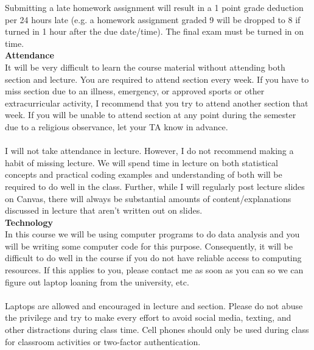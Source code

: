 \documentclass[12pt]{article}
\begin{document}
\noindent Submitting a late homework assignment will result in a 1 point grade deduction per 24 hours late (e.g. a homework assignment graded 9 will be dropped to 8 if turned in 1 hour after the due date/time).  The final exam must be turned in on time.\\

\noindent \Large \textbf{Attendance}\normalsize\\

\noindent It will be very difficult to learn the course material without attending both section and lecture.  You are required to attend section every week.  If you have to miss section due to an illness, emergency, or approved sports or other extracurricular activity, I recommend that you try to attend another section that week.  If you will be unable to attend section at any point during the semester due to a religious observance, let your TA know in advance.\\
\\
\noindent I will not take attendance in lecture.  However, I do not recommend making a habit of missing lecture.  We will spend time in lecture on both statistical concepts and practical coding examples and understanding of both will be required to do well in the class.  Further, while I will regularly post lecture slides on Canvas, there will always be substantial amounts of content/explanations discussed in lecture that aren’t written out on slides.\\

\noindent \Large \textbf{Technology}\normalsize\\

\noindent In this course we will be using computer programs to do data analysis and you will be writing some computer code for this purpose.  Consequently, it will be difficult to do well in the course if you do not have reliable access to computing resources.  If this applies to you, please contact me as soon as you can so we can figure out laptop loaning from the university, etc.\\
\\
\noindent Laptops are allowed and encouraged in lecture and section.  Please do not abuse the privilege and try to make every effort to avoid social media, texting, and other distractions during class time. Cell phones should only be used during class for classroom activities or two-factor authentication.\\
\end{document}
